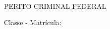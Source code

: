 \bigskip
\begin{center}
	~\bigskip

	\textbf{\MakeUppercase{\pfauthor}}
	
	PERITO CRIMINAL FEDERAL
	
	Classe \pfauthorclass\space - Matrícula: \pfauthormatr

	
\end{center}
